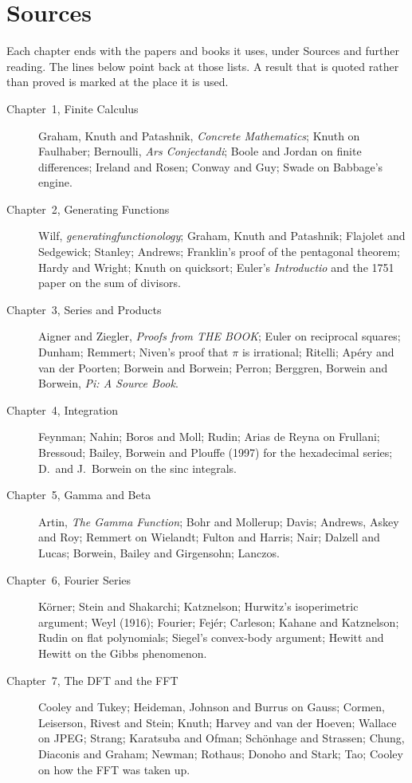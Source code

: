 \chapter*{Sources}
\noindent Each chapter ends with the papers and books it uses, under Sources and further reading. The lines below point back at those lists. A result that is quoted rather than proved is marked at the place it is used.

\begin{description}
\item[Chapter~1, Finite Calculus] Graham, Knuth and Patashnik, \emph{Concrete Mathematics}; Knuth on Faulhaber; Bernoulli, \emph{Ars Conjectandi}; Boole and Jordan on finite differences; Ireland and Rosen; Conway and Guy; Swade on Babbage's engine.
\item[Chapter~2, Generating Functions] Wilf, \emph{generatingfunctionology}; Graham, Knuth and Patashnik; Flajolet and Sedgewick; Stanley; Andrews; Franklin's proof of the pentagonal theorem; Hardy and Wright; Knuth on quicksort; Euler's \emph{Introductio} and the 1751 paper on the sum of divisors.
\item[Chapter~3, Series and Products] Aigner and Ziegler, \emph{Proofs from THE BOOK}; Euler on reciprocal squares; Dunham; Remmert; Niven's proof that $\pi$ is irrational; Ritelli; Ap\'ery and van der Poorten; Borwein and Borwein; Perron; Berggren, Borwein and Borwein, \emph{Pi: A Source Book}.
\item[Chapter~4, Integration] Feynman; Nahin; Boros and Moll; Rudin; Arias de Reyna on Frullani; Bressoud; Bailey, Borwein and Plouffe (1997) for the hexadecimal series; D.~and J.~Borwein on the sinc integrals.
\item[Chapter~5, Gamma and Beta] Artin, \emph{The Gamma Function}; Bohr and Mollerup; Davis; Andrews, Askey and Roy; Remmert on Wielandt; Fulton and Harris; Nair; Dalzell and Lucas; Borwein, Bailey and Girgensohn; Lanczos.
\item[Chapter~6, Fourier Series] K\"orner; Stein and Shakarchi; Katznelson; Hurwitz's isoperimetric argument; Weyl (1916); Fourier; Fej\'er; Carleson; Kahane and Katznelson; Rudin on flat polynomials; Siegel's convex-body argument; Hewitt and Hewitt on the Gibbs phenomenon.
\item[Chapter~7, The DFT and the FFT] Cooley and Tukey; Heideman, Johnson and Burrus on Gauss; Cormen, Leiserson, Rivest and Stein; Knuth; Harvey and van der Hoeven; Wallace on JPEG; Strang; Karatsuba and Ofman; Sch\"onhage and Strassen; Chung, Diaconis and Graham; Newman; Rothaus; Donoho and Stark; Tao; Cooley on how the FFT was taken up.

\end{description}
